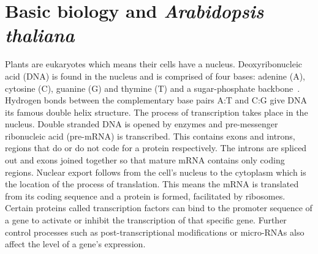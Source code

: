 \section{Basic biology and \emph{Arabidopsis thaliana}}\label{sec:basicBio}
Plants are eukaryotes which means their cells have a nucleus.
Deoxyribonucleic acid (DNA) is found in the nucleus and is comprised of four bases: adenine (A), cytosine (C), guanine (G) and thymine (T) and a sugar-phosphate backbone~\cite{alberts2008}.
Hydrogen bonds between the complementary base pairs A:T and C:G give DNA its famous double helix structure.
The process of transcription takes place in the nucleus.
Double stranded DNA is opened by enzymes and pre-messenger ribonucleic acid (pre-mRNA) is transcribed.
This contains exons and introns, regions that do or do not code for a protein respectively.
The introns are spliced out and exons joined together so that mature mRNA contains only coding regions.
Nuclear export follows from the cell's nucleus to the cytoplasm which is the location of the process of translation.
This means the mRNA is translated from its coding sequence and a protein is formed, facilitated by ribosomes.
Certain proteins called transcription factors can bind to the promoter sequence of a gene to activate or inhibit the transcription of that specific gene.
Further control processes such as post-transcriptional modifications or micro-RNAs also affect the level of a gene's expression.
